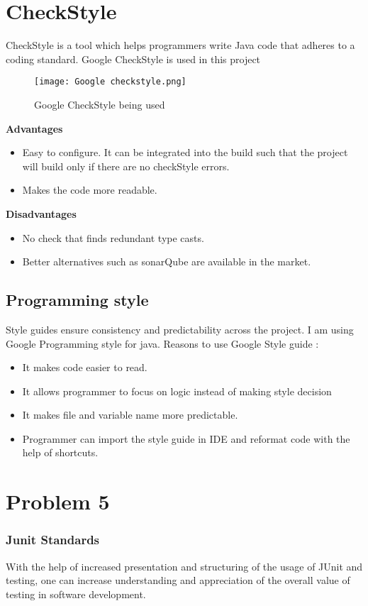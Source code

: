 \documentclass{article}
\begin{document}
\begin{enumerate}
\section{CheckStyle}
CheckStyle is a tool which helps programmers write Java code that adheres to a coding standard.\newline
Google CheckStyle\cite{9} is used in this project
\begin{figure}[htp]
\centering
\texttt{[image: Google checkstyle.png]}
\caption{Google CheckStyle being used}
\label{Use of checkstyle in the project}
\end{figure}\newline
\textbf{Advantages}
\begin{itemize}
\item Easy to configure. It can be integrated into the build such that the project will build only if there are no checkStyle errors.
\item Makes the code more readable.
\end{itemize}
\textbf{Disadvantages}
\begin{itemize}
\item No check that finds redundant type casts.
\item Better alternatives such as sonarQube are available in the market.
\end{itemize}\newpage
\subsection{Programming style}
Style guides ensure consistency and predictability across the project\cite{7}.
I am using Google Programming style for java. 
Reasons to use Google Style guide :
\begin{itemize}
\item It makes code easier to read.
\item It allows programmer to focus on logic instead of making style decision
\item It makes file and variable name more predictable.
\item Programmer can import the style guide  in IDE and reformat code with the help of shortcuts.
\end{itemize}
\section{Problem 5}
\subsubsection{Junit Standards}
 With the help of increased presentation and structuring of the usage of JUnit and testing, one can increase understanding and appreciation of the overall value of testing in software development.\cite{8}
\end{enumerate}
\end{document}
